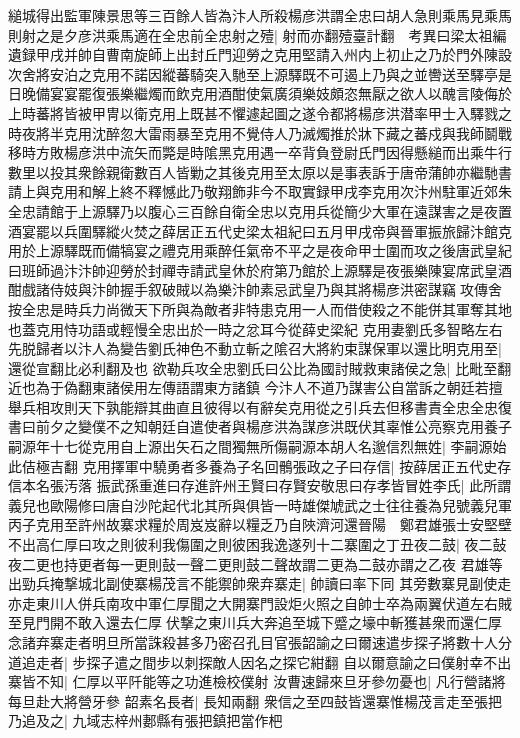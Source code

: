 縋城得出監軍陳景思等三百餘人皆為汴人所殺楊彦洪謂全忠曰胡人急則乘馬見乘馬則射之是夕彦洪乘馬適在全忠前全忠射之殪|{
	射而亦翻殪臺計翻　考異曰梁太祖編遺録甲戌并帥自曹南旋師上出封丘門迎勞之克用堅請入州内上初止之乃於門外陳設次舍將安泊之克用不諾因縱蕃騎突入馳至上源驛既不可遏上乃與之並轡送至驛亭是日晚備宴宴罷復張樂繼燭而飲克用酒酣使氣廣須樂妓頗恣無厭之欲人以醜言陵侮於上時蕃將皆被甲冑以衛克用上既甚不懼遽起圖之遂令都將楊彦洪潜率甲士入驛戮之時夜將半克用沈醉忽大雷雨暴至克用不覺侍人乃滅燭推於牀下藏之蕃戍與我師鬬戰移時方敗楊彦洪中流矢而斃是時隂黑克用遇一卒背負登尉氏門因得懸縋而出乘牛行數里以投其衆餘親衛數百人皆勦之其後克用至太原以是事表訴于唐帝蒲帥亦繼馳書請上與克用和解上終不釋憾此乃敬翔飾非今不取實録甲戌李克用次汴州駐軍近郊朱全忠請館于上源驛乃以腹心三百餘自衛全忠以克用兵從簡少大軍在遠謀害之是夜置酒宴罷以兵圍驛縱火焚之薛居正五代史梁太祖紀曰五月甲戌帝與晉軍振旅歸汴館克用於上源驛既而備犒宴之禮克用乘醉任氣帝不平之是夜命甲士圍而攻之後唐武皇紀曰班師過汴汴帥迎勞於封禪寺請武皇休於府第乃館於上源驛是夜張樂陳宴席武皇酒酣戲諸侍妓與汴帥握手叙破賊以為樂汴帥素忌武皇乃與其將楊彦洪密謀竊攻傳舍按全忠是時兵力尚微天下所與為敵者非特患克用一人而借使殺之不能併其軍奪其地也蓋克用恃功語或輕慢全忠出於一時之忿耳今從薛史梁紀}
克用妻劉氏多智略左右先脱歸者以汴人為變告劉氏神色不動立斬之隂召大將約束謀保軍以還比明克用至|{
	還從宣翻比必利翻及也}
欲勒兵攻全忠劉氏曰公比為國討賊救東諸侯之急|{
	比毗至翻近也為于偽翻東諸侯用左傳語謂東方諸鎮}
今汴人不道乃謀害公自當訴之朝廷若擅舉兵相攻則天下孰能辯其曲直且彼得以有辭矣克用從之引兵去但移書責全忠全忠復書曰前夕之變僕不之知朝廷自遣使者與楊彦洪為謀彦洪既伏其辜惟公亮察克用養子嗣源年十七從克用自上源出矢石之間獨無所傷嗣源本胡人名邈信烈無姓|{
	李嗣源始此佶極吉翻}
克用擇軍中驍勇者多養為子名回鶻張政之子曰存信|{
	按薛居正五代史存信本名張汚落}
振武孫重進曰存進許州王賢曰存賢安敬思曰存孝皆冒姓李氏|{
	此所謂義兒也歐陽修曰唐自沙陀起代北其所與俱皆一時雄傑虓武之士往往養為兒號義兒軍}
丙子克用至許州故寨求糧於周岌岌辭以糧乏乃自陜濟河還晉陽　鄭君雄張士安堅壁不出高仁厚曰攻之則彼利我傷圍之則彼困我逸遂列十二寨圍之丁丑夜二鼓|{
	夜二鼔夜二更也持更者每一更則鼔一聲二更則鼓二聲故謂二更為二鼓亦謂之乙夜}
君雄等出勁兵掩撃城北副使寨楊茂言不能禦帥衆弃寨走|{
	帥讀曰率下同}
其旁數寨見副使走亦走東川人併兵南攻中軍仁厚聞之大開寨門設炬火照之自帥士卒為兩翼伏道左右賊至見門開不敢入還去仁厚伏撃之東川兵大奔追至城下蹙之壕中斬獲甚衆而還仁厚念諸弃寨走者明旦所當誅殺甚多乃密召孔目官張韶諭之曰爾速遣步探子將數十人分道追走者|{
	步探子遣之間步以刺探敵人因名之探它紺翻}
自以爾意諭之曰僕射幸不出寨皆不知|{
	仁厚以平阡能等之功進檢校僕射}
汝曹速歸來旦牙參勿憂也|{
	凡行營諸將每旦赴大將營牙參}
韶素名長者|{
	長知兩翻}
衆信之至四鼓皆還寨惟楊茂言走至張把乃追及之|{
	九域志梓州郪縣有張把鎮把當作杷}
